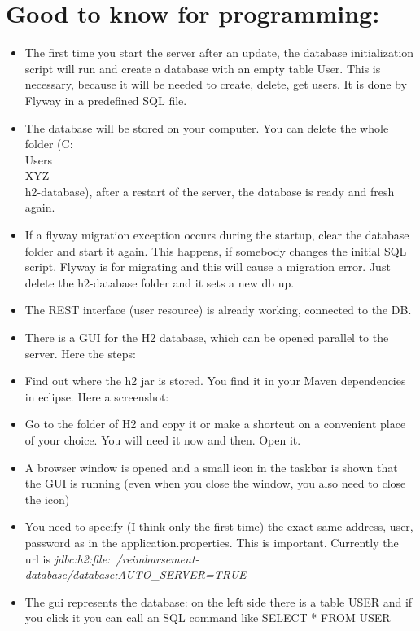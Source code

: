 \section{Good to know for programming:}
\begin{itemize}
	\item The first time you start the server after an update, the database initialization script will run and create a database with an empty table User. This is necessary, because it will be needed to create, delete, get users. It is done by Flyway in a predefined SQL file.
	\item The database will be stored on your computer. You can delete the whole folder (C:\\Users\\XYZ\\h2-database), after a restart of the server, the database is ready and fresh again.
	\item If a flyway migration exception occurs during the startup, clear the database folder and start it again. This happens, if somebody changes the initial SQL script. Flyway is for migrating and this will cause a migration error. Just delete the h2-database folder and it sets a new db up.
	\item The REST interface (user resource) is already working, connected to the DB.
	\item There is a GUI for the H2 database, which can be opened parallel to the server. Here the steps:
	\item Find out where the h2 jar is stored. You find it in your Maven dependencies in eclipse. Here a screenshot:  
	\item Go to the folder of H2 and copy it or make a shortcut on a convenient place of your choice. You will need it now and then. Open it.
	\item A browser window is opened and a small icon in the taskbar is shown that the GUI is running (even when you close the window, you also need to close the icon)
	\item You need to specify (I think only the first time) the exact same address, user, password as in the application.properties. This is important. Currently the url is\newline
\textit{jdbc:h2:file:~/reimbursement-database/database;AUTO\_SERVER=TRUE}
	\item The gui represents the database: on the left side there is a table USER and if you click it you can call an SQL command like SELECT * FROM USER
\end{itemize}

